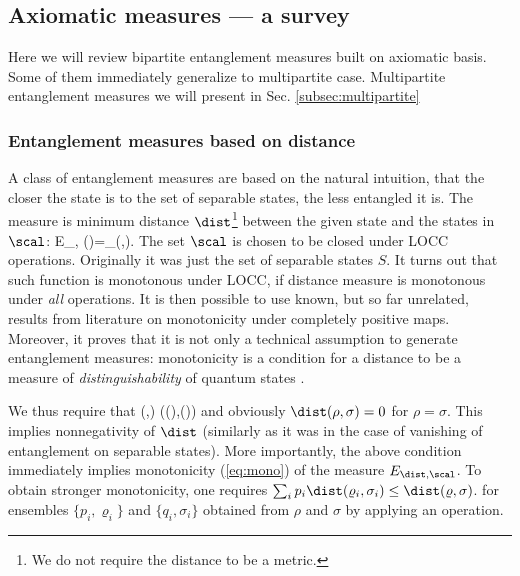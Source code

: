\documentclass[twocolumn,aps,rmp]{revtex4}
\begin{document}
\subsection{Axiomatic measures --- a survey}
\label{sec:measures-survey}
Here we will review bipartite entanglement measures built on axiomatic basis.
Some of them immediately generalize to multipartite case. Multipartite
entanglement measures we will present in Sec. \ref{subsec:multipartite}

\subsubsection{Entanglement measures based on distance}
\label{subsec-distance}

A class of entanglement measures \cite{VPRK1997,PlenioVedral1998} are based on the natural
intuition, that the closer the
state is to the set of separable states, the less entangled it is. The measure is
minimum distance $\dist$\footnote{We do not require the distance to  be a metric.} between the given state and the states in $\scal$:
\be
E_{\dist, \scal}(\varrho)=\inf_{\sigma\in \scal}\dist(\varrho,\sigma).
\label{eq-distance-measure}
\ee
The set $\scal$ is chosen to be closed under LOCC operations.
Originally it was just the set of separable states $S$.
It turns out that such function is monotonous under LOCC, if
distance measure is monotonous under {\it all} operations. It
is then possible to use known, but so far unrelated, results from literature
on monotonicity under completely positive maps. Moreover, it proves that it is
not only a technical assumption to generate entanglement measures:
monotonicity is a condition for a distance to be  a measure
of {\it distinguishability} of quantum states \cite{Fuchs-Graaf,VedralPJK1997-stat}.

We thus require that \be \dist(\rho,\sigma)\geq
\dist(\Lambda(\rho),\Lambda(\sigma)) \label{eq-distance-monotone}
\ee and obviously $\dist(\rho,\sigma)=0$ for $\rho=\sigma$. This
implies nonnegativity of $\dist$ (similarly as it was in the case of
vanishing of entanglement on separable states). More
importantly, the above condition immediately implies monotonicity
(\ref{eq:mono}) of the measure $E_{\dist,\scal}$. To obtain stronger
monotonicity, one requires $\sum_ip_i\dist(\varrho_i,\sigma_i)\leq
\dist(\varrho,\sigma)$. for ensembles $\{p_i,\varrho_i\}$ and
$\{q_i,\sigma_i\}$ obtained from $\rho$ and $\sigma$ by applying an
operation.
\end{document}
